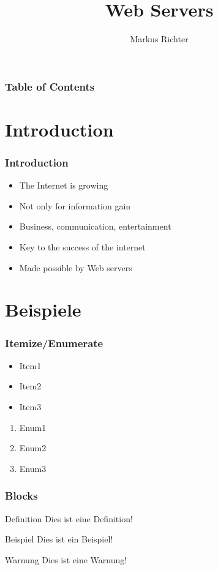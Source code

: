 \documentclass[9pt]{beamer}
\title{Web Servers}
\author[Richter]{Markus Richter}
\institute{Institut für Softwaretechnik und Programmiersprachen}
\begin{document}
\frame{\titlepage}

\begin{frame}
\frametitle<presentation>{Table of Contents}
\tableofcontents
\end{frame}

\section{Introduction}

\begin{frame}
\frametitle<presentation>{Introduction}
  \begin{itemize}
    \item The Internet is growing
    \item Not only for information gain
    \item Business, communication, entertainment
    \item Key to the success of the internet
    \item Made possible by Web servers
  \end{itemize}
\end{frame}

\section{Beispiele}

\begin{frame}
\frametitle<presentation>{Itemize/Enumerate}
\begin{itemize}
  \item Item1
  \item Item2
  \item Item3
\end{itemize}
\begin{enumerate}
  \item Enum1
  \item Enum2
  \item Enum3
\end{enumerate}
\end{frame}

\begin{frame}
\frametitle<presentation>{Blocks}
\begin{block}{Definition}
Dies ist eine Definition!
\end{block}
\begin{exampleblock}{Beispiel}
Dies ist ein Beispiel!
\end{exampleblock}
\begin{alertblock}{Warnung}
Dies ist eine Warnung!
\end{alertblock}
\end{frame}
\end{document}
